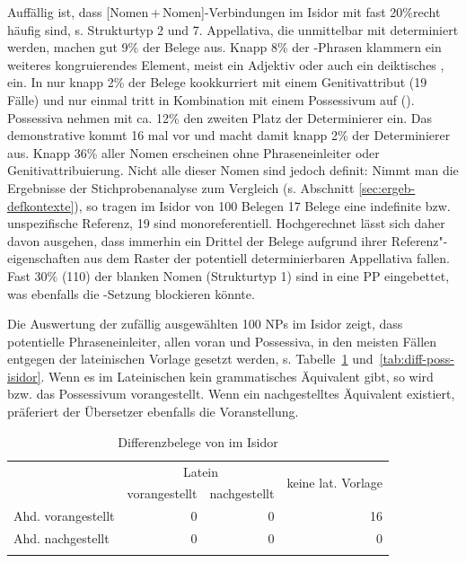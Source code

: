 Auffällig ist, dass [Nomen\,+\,Nomen]-Verbindungen im Isidor mit fast 20\%\linebreak recht häufig sind, s. Strukturtyp 2 und 7. Appellativa, die unmittelbar mit  determiniert werden, machen gut 9\% der Belege aus. Knapp 8\% der -Phrasen klammern ein weiteres kongruierendes Element, meist ein Adjektiv oder auch ein deiktisches , ein. In nur knapp 2\% der Belege kookkurriert  mit einem Genitivattribut (19 Fälle) und nur einmal tritt  in Kombination mit einem Possessivum auf (). Possessiva  nehmen mit ca. 12\% den zweiten Platz der Determinierer ein. Das demonstrative  kommt 16 mal vor und macht damit  knapp 2\% der Determinierer aus. Knapp 36\% aller Nomen erscheinen ohne Phraseneinleiter oder Genitivattribuierung. Nicht alle dieser Nomen sind jedoch definit:  Nimmt man die Ergebnisse der Stichprobenanalyse zum Vergleich (s. Abschnitt \ref{sec:ergeb-defkontexte}), so tragen im Isidor von 100 Belegen 17 Belege eine indefinite bzw. unspezifische Referenz, 19 sind monoreferentiell. Hochgerechnet lässt sich daher davon ausgehen, dass immerhin ein Drittel der Belege aufgrund ihrer Referenz"-eigenschaften aus dem Raster der potentiell determinierbaren Appellativa fallen. Fast 30\% (110) der blanken Nomen (Strukturtyp 1) sind in eine PP eingebettet, was ebenfalls die -Setzung blockieren könnte. 

Die Auswertung der zufällig ausgewählten 100 NPs im Isidor zeigt, dass potentielle Phraseneinleiter, allen voran  und Possessiva, in den meisten Fällen entgegen der lateinischen Vorlage gesetzt werden, s. Tabelle~\ref{tab:diff-ther-isidor} und~\ref{tab:diff-poss-isidor}. Wenn es im Lateinischen kein grammatisches Äquivalent gibt, so wird  bzw. das Possessivum vorangestellt. Wenn ein nachgestelltes Äquivalent existiert, präferiert der Übersetzer ebenfalls die Voranstellung.

\begin{table}
\centering
\begin{tabular}{lrrr}
\lsptoprule
                   & \multicolumn{2}{c}{Latein} & \multirow{2}{*}{keine lat. Vorlage}\\
 \cmidrule(lr){2-3}
                   & vorangestellt & nachgestellt & \\ \midrule
Ahd. vorangestellt & 0                  & 0                 & 16                    \\
Ahd. nachgestellt  & 0                  & 0                 & 0                    \\ \lspbottomrule
\end{tabular}
\caption{Differenzbelege von  im Isidor}
\label{tab:diff-ther-isidor}
\end{table}

